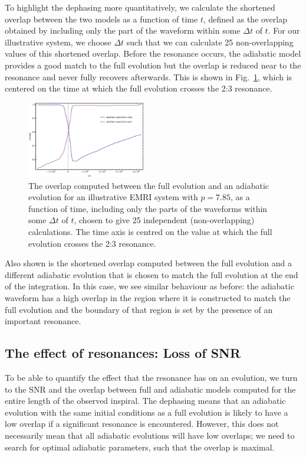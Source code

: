 \documentclass[aps,prd,amsfonts,amssymb,amsmath,nofootinbib,reprint,showpacs]{revtex4}
\newcommand{\figref}[1]{Fig.\ \ref{fig:#1}}
\begin{document}
To highlight the dephasing more quantitatively, we calculate the shortened overlap between the two models as a function of time $t$, defined as the overlap obtained by including only the part of the waveform within some $\Delta t$ of $t$. For our illustrative system, we choose $\Delta t$ such that we can calculate 25 non-overlapping values of this shortened overlap. Before the resonance occurs, the adiabatic model provides a good match to the full evolution but the overlap is reduced near to the resonance and never fully recovers afterwards. This is shown in \figref{overlap-dephasing}, which is centered on the time at which the full evolution crosses the 2:3 resonance.

\begin{figure}[htbp]
\centering
\includegraphics[width=0.46\textwidth]{Fig_overlap_vs_time}
\caption{\label{fig:overlap-dephasing}The overlap computed between the full evolution and an adiabatic evolution for an illustrative EMRI system with $p=7.85$, as a function of time, including only the parts of the waveforms within some $\Delta t$ of $t$, chosen to give 25 independent (non-overlapping) calculations. The time axis is centred on the value at which the full evolution crosses the 2:3 resonance.}
\end{figure}

Also shown is the shortened overlap computed between the full evolution and a different adiabatic evolution that is chosen to match the full evolution at the end of the integration. In this case, we see similar behaviour as before: the adiabatic waveform has a high overlap in the region where it is constructed to match the full evolution and the boundary of that region is set by the presence of an important resonance.

\subsection{The effect of resonances: Loss of SNR}
\label{sec:SNRloss}

To be able to quantify the effect that the resonance has on an evolution, we turn to the SNR and the overlap between full and adiabatic models computed for the entire length of the observed inspiral. The dephasing means that an adiabatic evolution with the same initial conditions as a full evolution is likely to have a low overlap if a significant resonance is encountered. However, this does not necessarily mean that all adiabatic evolutions will have low overlaps; we need to search for optimal adiabatic parameters, such that the overlap is maximal.
\end{document}

